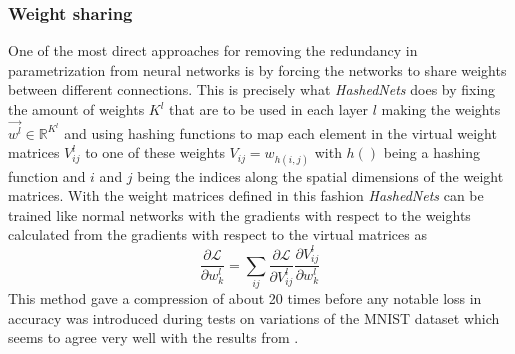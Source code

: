 \documentclass{kththesis}
\newcommand{\bibentry}[1]{\parencite{#1}}
\begin{document}
\subsubsection{Weight sharing}
One of the most direct approaches for removing the redundancy in parametrization
from neural networks is by forcing the networks to share weights between
different connections. This is precisely what \emph{HashedNets}
\bibentry{chen2015compressing} does by fixing the amount of weights
\(K^l\) that
are to be used in each layer \(l\) making the weights \(\vec{w^l} \in
\mathbb{R}^{K^l}\) and using hashing functions to map each element in the
virtual weight matrices \(V_{ij}^l\) to one of these weights \(V_{ij} =
w_{h(i,j)}\) with \(h()\) being a hashing function and \(i\) and \(j\) being the
indices along the spatial dimensions of the weight matrices. With the weight matrices
defined in this fashion \emph{HashedNets} can be trained like normal networks
with the gradients with respect to the weights calculated from the gradients
with respect to the virtual matrices as  
\[ \frac{\partial\mathcal{L}}{\partial w_k^l} = \sum_{ij} \frac{\partial\mathcal{L}}{\partial V_{ij}^l}\frac{\partial V_{ij}^l}{\partial w_k^l} \]
This method gave a compression of about 20 times before any notable loss in
accuracy was introduced during tests on variations of the MNIST dataset \parencite{larochelle2007empirical} which
seems to agree very well with the results from \bibentry{denil2013predicting}. 
\end{document}
